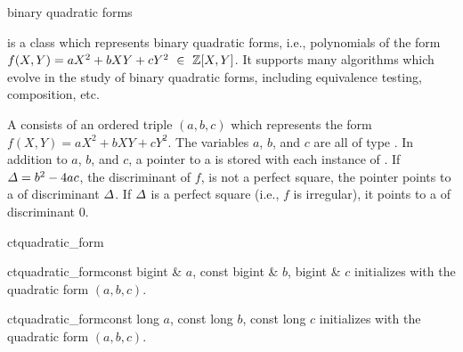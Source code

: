 

\NAME

 \dotfill binary quadratic forms



\ABSTRACT

 is a class which represents binary quadratic forms, i.e., polynomials of
the form $f(X, Y) = a X^2 + b X Y + c Y^2 ~ \in ~ \mathbb{Z} [X, Y]$.  It supports many algorithms
which evolve in the study of binary quadratic forms, including equivalence testing, composition,
etc.



\DESCRIPTION

A  consists of an ordered triple $(a, b, c)$ which represents the form
$f(X, Y) = a X^2 + b X Y + c Y^2$.  The variables $a$, $b$, and $c$ are all of type
.  In addition to $a$, $b$, and $c$, a pointer to a  is
stored with each instance of .  If $\varDelta = b^2 - 4ac$, the discriminant of
$f$, is not a perfect square, the pointer points to a  of discriminant
$\varDelta$.  If $\varDelta$ is a perfect square (i.e., $f$ is irregular), it points to a
 of discriminant $0$.



\CONS

\begin{fcode}{ct}{quadratic_form}{}
\end{fcode}

\begin{fcode}{ct}{quadratic_form}{const bigint & $a$, const bigint & $b$, bigint & $c$}
  initializes with the quadratic form $(a,b,c)$.
\end{fcode}

\begin{fcode}{ct}{quadratic_form}{const long $a$, const long $b$, const long $c$}
  initializes with the quadratic form $(a,b,c)$.
\end{fcode}

